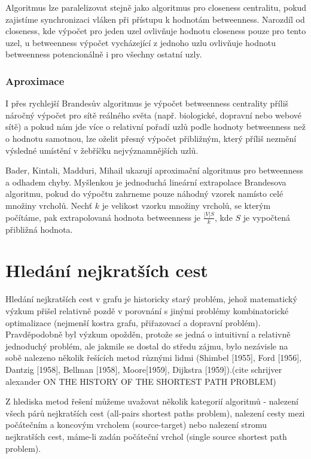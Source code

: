 \documentclass[12pt,titlepage]{report}
\begin{document}
Algoritmus lze paralelizovat stejně jako algoritmus pro closeness centralitu,
pokud zajistíme synchronizaci vláken při přístupu k hodnotám betweenness.
Narozdíl od closeness, kde výpočet pro jeden uzel ovlivňuje hodnotu closeness
pouze pro tento uzel, u betweenness výpočet vycházející z jednoho uzlu ovlivňuje
hodnotu betweenness potencionálně i pro všechny ostatní uzly.

\subsubsection{Aproximace}
I přes rychlejší Brandesův algoritmus je výpočet betweenness centrality příliš
náročný výpočet pro sítě reálného světa (např. biologické, dopravní nebo webové
sítě) a pokud nám jde více o relativní pořadí uzlů podle hodnoty betweenness než
o hodnotu samotnou, lze oželit přesný výpočet přibližným, který příliš nezmění
výsledné umístění v žebříčku nejvýznamnějších uzlů.

Bader, Kintali, Madduri, Mihail ukazují aproximační algoritmus pro betweenness a
odhadem chyby.  Myšlenkou je jednoduchá lineární extrapolace Brandesova
algoritmu, pokud do výpočtu zahrneme pouze náhodný vzorek namísto celé množiny
vrcholů. Nechť $k$ je velikost vzorku množiny vrcholů, se kterým počítáme, pak
extrapolovaná hodnota betweenness je $\frac{|V| S}{k}$, kde $S$ je vypočtená
přibližná hodnota.



\section{Hledání nejkratších cest}
Hledání nejkratších cest v grafu je historicky starý problém, jehož matematický
výzkum přišel relativně pozdě v porovnání s jinými problémy kombinatorické
optimalizace (nejmenší kostra grafu, přiřazovací a dopravní problém).
Pravděpodobně byl výzkum opožděn, protože se jedná o intuitivní a relativně
jednoduchý problém, ale jakmile se dostal do středu zájmu, bylo nezávisle na
sobě nalezeno několik řešících metod různými lidmi (Shimbel [1955], Ford
[1956], Dantzig [1958], Bellman [1958], Moore[1959], Dijkstra [1959]).(cite
schrijver alexander ON THE HISTORY OF THE SHORTEST PATH PROBLEM)

Z hlediska metod řešení můžeme uvažovat několik kategorií algoritmů - nalezení
všech párů nejkratších cest (all-pairs shortest paths problem), nalezení cesty
mezi počátečním a koncovým vrcholem (source-target) nebo nalezení stromu
nejkratších cest, máme-li zadán počáteční vrchol (single source shortest path
problem).
\end{document}
